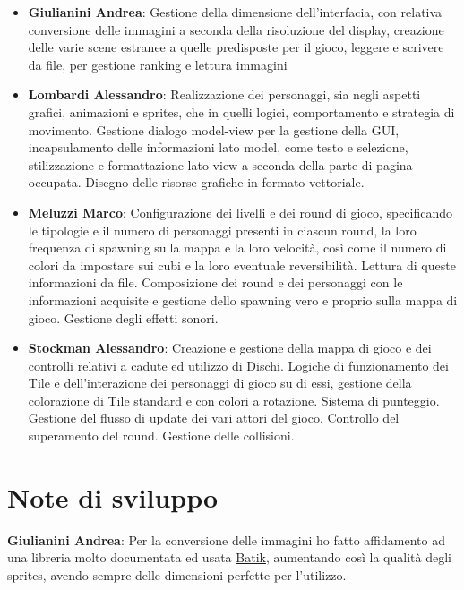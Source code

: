 \documentclass[a4paper,12pt, hidelinks]{report}
\begin{document}
\begin{itemize}
	\item \textbf{Giulianini Andrea}: Gestione della dimensione dell'interfacia, con relativa conversione delle immagini a seconda della risoluzione del display, creazione delle varie scene estranee a quelle predisposte per il gioco, leggere e scrivere da file, per gestione ranking e lettura immagini

	\item \textbf{Lombardi Alessandro}: Realizzazione dei personaggi, sia negli aspetti grafici, animazioni e sprites, che in quelli logici, comportamento e strategia di movimento. Gestione dialogo model-view per la gestione della GUI, incapsulamento delle informazioni lato model, come testo e selezione, stilizzazione e formattazione lato view a seconda della parte di pagina occupata. Disegno delle risorse grafiche in formato vettoriale.

	\item \textbf{Meluzzi Marco}: Configurazione dei livelli e dei round di gioco, specificando le tipologie e il numero di personaggi presenti in ciascun round, la loro frequenza di spawning sulla mappa e la loro velocità, così come il numero di colori da impostare sui cubi e la loro eventuale reversibilità. Lettura di queste informazioni da file. Composizione dei round e dei personaggi con le informazioni acquisite e gestione dello spawning vero e proprio sulla mappa di gioco. Gestione degli effetti sonori.

	\item \textbf{Stockman Alessandro}: Creazione e gestione della mappa di gioco e dei controlli relativi a cadute ed utilizzo di Dischi. Logiche di funzionamento dei Tile e dell'interazione dei personaggi di gioco su di essi, gestione della colorazione di Tile standard e con colori a rotazione. Sistema di punteggio. Gestione del flusso di update dei vari attori del gioco. Controllo del superamento del round. Gestione delle collisioni.

\end{itemize}

\section{Note di sviluppo}

	\item \textbf{Giulianini Andrea}: Per la conversione delle immagini ho fatto affidamento ad una libreria molto documentata ed usata \href{https://xmlgraphics.apache.org/batik/using/swing.html}{Batik}, aumentando così la qualità degli sprites, avendo sempre delle dimensioni perfette per l'utilizzo.
\end{document}
